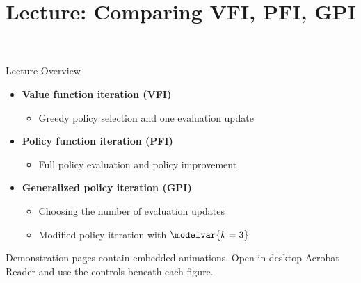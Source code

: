 \newcommand{\CourseTemplatePath}{../../../../../templates/slides/}

\usepackage{animate}
\title[Maze: VFI, PFI and GPI]{Lecture: Comparing VFI, PFI, GPI}

\makecoursetitle
\begin{frame}{Lecture Overview}
\begin{itemize}
\item \textbf{Value function iteration (VFI)}
  \begin{itemize}\item Greedy policy selection and one evaluation update\end{itemize}
\item \textbf{Policy function iteration (PFI)}
  \begin{itemize}\item Full policy evaluation and policy improvement\end{itemize}
\item \textbf{Generalized policy iteration (GPI)}
  \begin{itemize}\item Choosing the number of evaluation updates\item Modified policy iteration with \(\modelvar{k=3}\)\end{itemize}
\end{itemize}
\medskip\footnotesize Demonstration pages contain embedded animations. Open in desktop Acrobat Reader and use the controls beneath each figure.
\end{frame}
